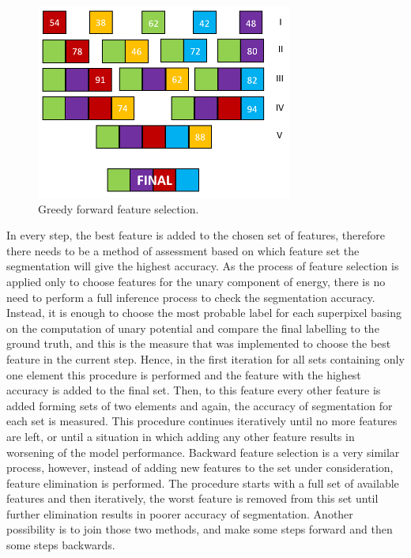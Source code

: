 \begin{figure}[ht]
    \centering
    \includegraphics[width=0.75\textwidth]{images/nonlinear_intro/greedy_forward.png}
    \caption{Greedy forward feature selection.}
    \label{fig:greedy_selection}
\end{figure}

In every step, the best feature is added to the chosen set of features, therefore there needs to be a method of assessment based on which feature set the segmentation will give the highest accuracy. As the process of feature selection is applied only to choose features for the unary component of energy, there is no need to perform a full inference process to check the segmentation accuracy. Instead, it is enough to choose the most probable label for each superpixel basing on the computation of unary potential and compare the final labelling to the ground truth, and this is the measure that was implemented to choose the best feature in the current step. Hence, in the first iteration for all sets containing only one element this procedure is performed and the feature with the highest accuracy is added to the final set. Then, to this feature every other feature is added forming sets of two elements and again, the accuracy of segmentation for each set is measured. This procedure continues iteratively until no more features are left, or until a situation in which adding any other feature results in worsening of the model performance. 
Backward feature selection is a very similar process, however, instead of adding new features to the set under consideration, feature elimination is performed. The procedure starts with a full set of available features and then iteratively, the worst feature is removed from this set until further elimination results in poorer accuracy of segmentation. Another possibility is to join those two methods, and make some steps forward and then some steps backwards. 

